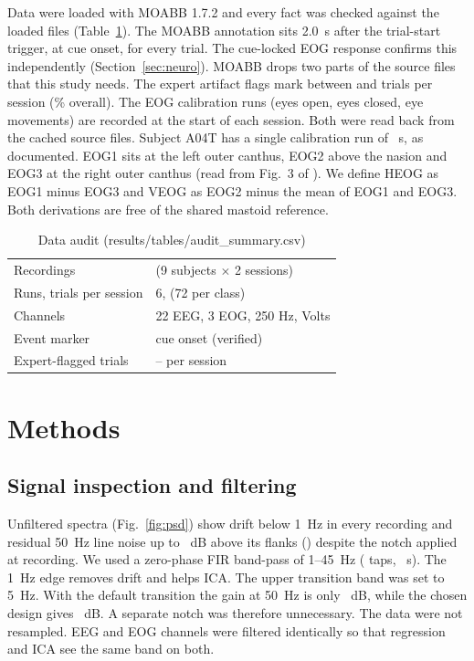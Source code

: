 \documentclass[conference]{IEEEtran}
\begin{document}
Data were loaded with MOABB 1.7.2 and every fact was checked against the loaded files (Table~\ref{tab:audit}). The MOABB annotation sits 2.0~s after the trial-start trigger, at cue onset, for every trial. The cue-locked EOG response confirms this independently (Section~\ref{sec:neuro}). MOABB drops two parts of the source files that this study needs. The expert artifact flags mark between \ExpertMin{} and \ExpertMax{} trials per session (\ExpertPct{}\% overall). The EOG calibration runs (eyes open, eyes closed, eye movements) are recorded at the start of each session. Both were read back from the cached source files. Subject A04T has a single calibration run of \CalibAFourT{}~s, as documented. EOG1 sits at the left outer canthus, EOG2 above the nasion and EOG3 at the right outer canthus (read from Fig.~3 of \cite{brunner2008}). We define HEOG as EOG1 minus EOG3 and VEOG as EOG2 minus the mean of EOG1 and EOG3. Both derivations are free of the shared mastoid reference.

\begin{table}[t]
\caption{Data audit (results/tables/audit\_summary.csv)}
\label{tab:audit}
\centering
\begin{tabular}{@{}ll@{}}
\toprule
Recordings & \NRecordings{} (9 subjects $\times$ 2 sessions)\\
Runs, trials per session & 6, \NTrialsSession{} (72 per class)\\
Channels & 22 EEG, 3 EOG, 250 Hz, Volts\\
Event marker & cue onset (verified)\\
Expert-flagged trials & \ExpertMin{}--\ExpertMax{} per session\\
\bottomrule
\end{tabular}
\end{table}

\section{Methods}
\subsection{Signal inspection and filtering}
Unfiltered spectra (Fig.~\ref{fig:psd}) show drift below 1~Hz in every recording and residual 50~Hz line noise up to \LineMax{}~dB above its flanks (\LineMaxRec{}) despite the notch applied at recording. We used a zero-phase FIR band-pass of 1--45~Hz (\FilterTaps{} taps, \FilterLenS{}~s). The 1~Hz edge removes drift and helps ICA. The upper transition band was set to 5~Hz. With the default transition the gain at 50~Hz is only \GainFiftyDefault{}~dB, while the chosen design gives \GainFifty{}~dB. A separate notch was therefore unnecessary. The data were not resampled. EEG and EOG channels were filtered identically so that regression and ICA see the same band on both.
\end{document}
